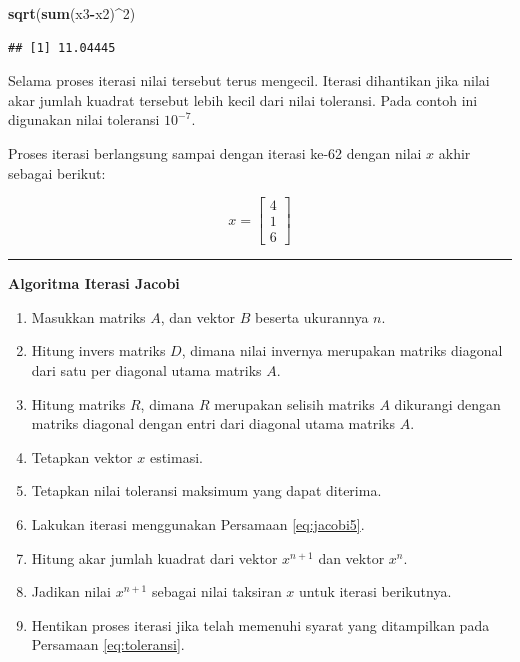 \documentclass[]{book}
\newenvironment{Shaded}{\begin{snugshade}}{\end{snugshade}}
\newcommand{\DecValTok}[1]{\textcolor[rgb]{0.00,0.00,0.81}{#1}}
\newcommand{\KeywordTok}[1]{\textcolor[rgb]{0.13,0.29,0.53}{\textbf{#1}}}
\newcommand{\NormalTok}[1]{#1}
\newcommand{\OperatorTok}[1]{\textcolor[rgb]{0.81,0.36,0.00}{\textbf{#1}}}
\providecommand{\tightlist}{%
  \setlength{\itemsep}{0pt}\setlength{\parskip}{0pt}}
\theoremstyle{definition}
\theoremstyle{definition}
\theoremstyle{definition}
\theoremstyle{remark}
\begin{document}
\begin{Shaded}
\begin{Highlighting}[]
\KeywordTok{sqrt}\NormalTok{(}\KeywordTok{sum}\NormalTok{(x3}\OperatorTok{-}\NormalTok{x2)}\OperatorTok{^}\DecValTok{2}\NormalTok{)}
\end{Highlighting}
\end{Shaded}

\begin{verbatim}
## [1] 11.04445
\end{verbatim}

Selama proses iterasi nilai tersebut terus mengecil. Iterasi dihantikan jika nilai akar jumlah kuadrat tersebut lebih kecil dari nilai toleransi. Pada contoh ini digunakan nilai toleransi \(10^{-7}\).

Proses iterasi berlangsung sampai dengan iterasi ke-62 dengan nilai \(x\) akhir sebagai berikut:

\[
x = \begin{bmatrix}
     4     \\[0.3em]
     1     \\[0.3em]
     6
\end{bmatrix}
\]

\begin{center}\rule{0.5\linewidth}{\linethickness}\end{center}

\textbf{Algoritma Iterasi Jacobi}

\begin{enumerate}
\def\labelenumi{\arabic{enumi}.}
\tightlist
\item
  Masukkan matriks \(A\), dan vektor \(B\) beserta ukurannya \(n\).
\item
  Hitung invers matriks \(D\), dimana nilai invernya merupakan matriks diagonal dari satu per diagonal utama matriks \(A\).
\item
  Hitung matriks \(R\), dimana \(R\) merupakan selisih matriks \(A\) dikurangi dengan matriks diagonal dengan entri dari diagonal utama matriks \(A\).
\item
  Tetapkan vektor \(x\) estimasi.
\item
  Tetapkan nilai toleransi maksimum yang dapat diterima.
\item
  Lakukan iterasi menggunakan Persamaan \eqref{eq:jacobi5}.
\item
  Hitung akar jumlah kuadrat dari vektor \(x^{n+1}\) dan vektor \(x^n\).
\item
  Jadikan nilai \(x^{n+1}\) sebagai nilai taksiran \(x\) untuk iterasi berikutnya.
\item
  Hentikan proses iterasi jika telah memenuhi syarat yang ditampilkan pada Persamaan \eqref{eq:toleransi}.
\end{enumerate}
\end{document}
